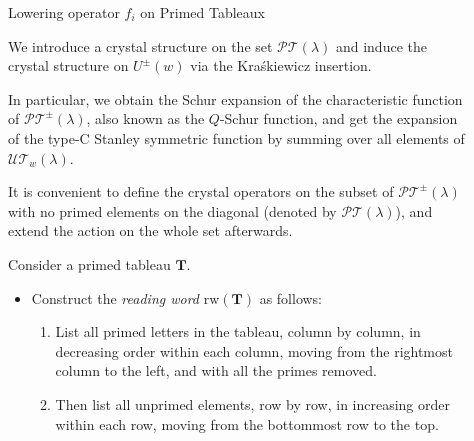 \documentclass[final]{beamer}
\newcommand{\darkred}{\color{darkred}} %
\newcommand{\defn}[1]{\emph{\darkred #1}} %
\newlength{\sepwid}
\newlength{\onecolwid}
\newlength{\twocolwid}
\begin{document}
\begin{frame}[t]
\begin{columns}[t]
\begin{column}{\twocolwid}
\begin{columns}[t]
\begin{column}{\onecolwid}
\end{column} %

\end{columns}

\end{column}

\begin{column}{\sepwid}\end{column} %

\begin{column}{\onecolwid}\vspace{-.6in} %


\begin{block}{Lowering operator $f_i$ on Primed Tableaux}

We introduce a crystal structure on the set $\mathcal{PT}(\lambda)$ and induce the crystal structure on $U^\pm(w)$ via the Kra\'skiewicz insertion. 

In particular, we obtain the Schur expansion of the characteristic function of $\mathcal{PT}^\pm (\lambda)$, also known as the $Q$-Schur function, and get the expansion of the type-C Stanley symmetric function by summing over all elements of $\mathcal{UT}_w (\lambda)$.

It is convenient to define the crystal operators on the subset of $\mathcal{PT}^\pm (\lambda)$ with no primed elements on the diagonal (denoted by $\mathcal{PT} (\lambda)$), and extend the action on the whole set afterwards. 

Consider a primed tableau $\mathbf{T}$.

\begin{itemize}
\item Construct the \defn{reading word}  $\mathrm{rw}(\mathbf{T})$ as follows:

	\begin{enumerate}
	\item List all primed letters in the tableau, column by column, in decreasing order within each column, moving from the rightmost column to the left, and with all the primes removed.
	\item Then list all unprimed elements, row by row, in increasing order within each row, moving from the bottommost row to the top.
	\end{enumerate}


\end{itemize}
\end{block}
\end{column}
\end{columns}
\end{frame}
\end{document}
